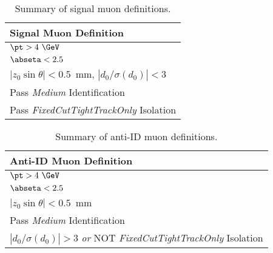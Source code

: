 \begin{table}[!htb]
\begin{center}
\begin{tabular}{l}
\hline
Signal Muon Definition  \\
\hline \hline
$\pt > 4~\GeV$      \\
$\abseta < 2.5$      \\
$|z_0\sin\theta| < 0.5$~mm,  $|d_0/\sigma(d_0)| < 3$    \\
Pass \textit{Medium} Identification     \\
Pass \textit{FixedCutTightTrackOnly} Isolation    \\
\hline
\end{tabular}
\caption{Summary of signal muon definitions.}
\label{tab:IDLepDefs}
\end{center}
\end{table}

\begin{table}[!htb]
\begin{center}
\begin{tabular}{l}
\hline
Anti-ID Muon Definition \\
\hline
$\pt > 4~\GeV$ \\
 $\abseta < 2.5$ \\
 $|z_0\sin\theta| < 0.5$~mm \\
Pass \textit{Medium} Identification \\
\hline
$|d_0/\sigma(d_0)| > 3$ \textit{or} NOT \textit{FixedCutTightTrackOnly} Isolation \\
\hline
\end{tabular}

\caption{Summary of anti-ID muon definitions.}
\label{tab:antiIDMuDefs}
\end{center}
\end{table}


